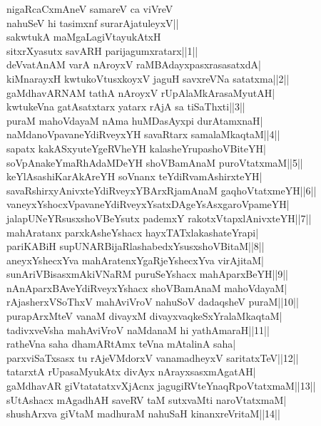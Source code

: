\documentclass{article}
\begin{document}
nigaRcaCxmAneV samareV ca viVreV\\
nahuSeV hi tasimxnf surarAjatuleyxV||\\
sakwtukA maMgaLagiVtayukAtxH\\
sitxrXyasutx savARH parijagumxratarx||1||\\
deVvatAnAM varA nAroyxV raMBAdayxpasxrasasatxdA|\\
kiMnarayxH kwtukoVtusxkoyxV jaguH savxreVNa satatxma||2||\\
gaMdhavARNAM tathA nAroyxV rUpAlaMkArasaMyutAH|\\
kwtukeVna gatAsatxtarx yatarx rAjA sa tiSaThxti||3||\\
puraM mahoVdayaM nAma huMDasAyxpi durAtamxnaH|\\
naMdanoVpavaneYdiRveyxYH savaRtarx samalaMkaqtaM||4||\\
sapatx kakASxyuteYgeRVheYH kalasheYrupashoVBiteYH|\\
soVpAnakeYmaRhAdaMDeYH shoVBamAnaM puroVtatxmaM||5||\\
keYlAsashiKarAkAreYH soVnanx teYdiRvamAshirxteYH|\\
savaRshirxyAnivxteYdiRveyxYBArxRjamAnaM gaqhoVtatxmeYH||6||\\
vaneyxYshocxVpavaneYdiRveyxYsatxDAgeYsAsxgaroVpameYH|\\
jalapUNeYRsusxshoVBeYsutx pademxY rakotxVtapxlAnivxteYH||7||\\
mahAratanx parxkAsheYshacx hayxTATxlakashateYrapi|\\
pariKABiH supUNARBijaRlashabedxYsusxshoVBitaM||8||\\
aneyxYshecxYva mahAratenxYgaRjeYshecxYva virAjitaM|\\
sunAriVBisasxmAkiVNaRM puruSeYshacx mahAparxBeYH||9||\\
nAnAparxBAveYdiRveyxYshacx shoVBamAnaM mahoVdayaM|\\
rAjasherxVSoThxV mahAviVroV nahuSoV dadaqsheV puraM||10||\\
purapArxMteV vanaM divayxM divayxvaqkeSxYralaMkaqtaM|\\
tadivxveVsha mahAviVroV naMdanaM hi yathAmaraH||11||\\
ratheVna saha dhamARtAmx teVna mAtalinA saha|\\
parxviSaTxsasx tu rAjeVMdorxV vanamadheyxV saritatxTeV||12||\\
tatarxtA rUpasaMyukAtx divAyx nArayxsasxmAgatAH|\\
gaMdhavAR giVtatatatxvXjAcnx jagugiRVteYnaqRpoVtatxmaM||13||\\
sUtAshacx mAgadhAH saveRV taM sutxvaMti naroVtatxmaM|\\
shushArxva giVtaM madhuraM nahuSaH kinanxreVritaM||14||
\end{document}
